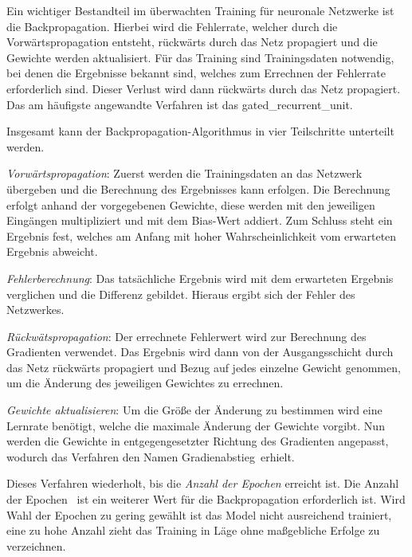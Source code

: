 Ein wichtiger Bestandteil im überwachten Training für neuronale Netzwerke ist die Backpropagation. Hierbei wird die Fehlerrate, welcher durch die Vorwärtspropagation entsteht, rückwärts durch das Netz propagiert und die Gewichte werden aktualisiert. Für das Training sind Trainingsdaten notwendig, bei denen die Ergebnisse bekannt sind, welches zum Errechnen der Fehlerrate erforderlich sind. Dieser Verlust wird dann rückwärts durch das Netz propagiert. Das am häufigste angewandte Verfahren ist das \gls{gated_recurrent_unit}.\vspace{0.2cm}

Insgesamt kann der Backpropagation-Algorithmus in vier Teilschritte unterteilt werden.\vspace{0.2cm}

\textit{Vorwärtspropagation}: Zuerst werden die Trainingsdaten an das Netzwerk übergeben und die Berechnung des Ergebnisses kann erfolgen. Die Berechnung erfolgt anhand der vorgegebenen Gewichte, diese werden mit den jeweiligen Eingängen multipliziert und mit dem Bias-Wert addiert. Zum Schluss steht ein Ergebnis fest, welches am Anfang mit hoher Wahrscheinlichkeit vom erwarteten Ergebnis abweicht.\vspace{0.2cm}

\textit{Fehlerberechnung}: Das tatsächliche Ergebnis wird mit dem erwarteten Ergebnis verglichen und die Differenz gebildet. Hieraus ergibt sich der Fehler des Netzwerkes.\vspace{0.2cm}

\textit{Rückwätspropagation}: Der errechnete Fehlerwert wird zur Berechnung des Gradienten verwendet. Das Ergebnis wird dann von der Ausgangsschicht durch das Netz rückwärts propagiert und Bezug auf jedes einzelne Gewicht genommen, um die Änderung des jeweiligen Gewichtes zu errechnen.\vspace{0.2cm}

\textit{Gewichte aktualisieren}: Um die Größe der Änderung zu bestimmen wird eine Lernrate benötigt, welche die maximale Änderung der Gewichte vorgibt. Nun werden die Gewichte in entgegengesetzter Richtung des Gradienten angepasst, wodurch das Verfahren den Namen \glqq Gradienabstieg\grqq \ erhielt.\vspace{0.2cm}

Dieses Verfahren wiederholt, bis die \textit{Anzahl der Epochen} erreicht ist. Die \glqq Anzahl der Epochen \grqq \ ist ein weiterer Wert für die Backpropagation erforderlich ist. Wird Wahl der Epochen zu gering gewählt ist das Model nicht ausreichend trainiert, eine zu hohe Anzahl zieht das Training in Läge ohne maßgebliche Erfolge zu verzeichnen.\vspace{0.2cm}

